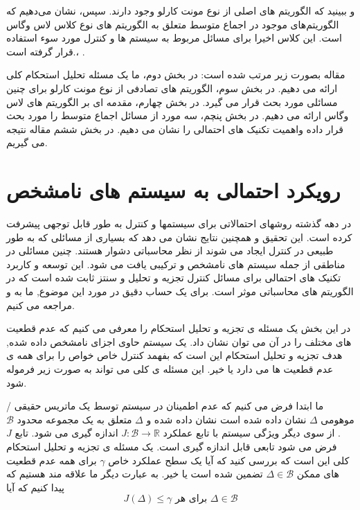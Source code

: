 \documentclass[12pt]{article} %
\begin{document}
	و ببینید که الگوریتم های اصلی از نوع مونت کارلو وجود دارند.
	سپس، نشان می‌دهیم که الگوریتم‌های موجود در
	اجماع متوسط ​​متعلق به الگوریتم های نوع کلاس لاس وگاس است.
	این کلاس اخیرا برای مسائل مربوط به سیستم ها و کنترل  مورد سوء استفاده قرار گرفته است.\cite{bib11}، \cite{bib24}.
	\par
	مقاله بصورت زیر مرتب شده است:
	در بخش دوم، ما
	یک مسئله تحلیل استحکام کلی ارائه می دهیم.
	در بخش سوم، الگوریتم های تصادفی از نوع مونت کارلو برای
	چنین مسائلی مورد بحث قرار می گیرد.
	در بخش چهارم، مقدمه ای بر الگوریتم های لاس وگاس ارائه می دهیم.
	در بخش پنچم،
	سه مورد از مسائل اجماع متوسط ​​را مورد بحث قرار داده واهمیت تکنیک های احتمالی را نشان می دهیم.
	در بخش ششم مقاله نتیجه می گیریم.
	
	\section{رویکرد احتمالی به سیستم های نامشخص}
	در دهه گذشته روشهای احتمالاتی برای سیستمها
	و کنترل به طور قابل توجهی پیشرفت کرده است.
	این تحقیق و 
	همچنین نتایج نشان می دهد که بسیاری از 
	مسائلی که به طور طبیعی در کنترل ایجاد می شوند از نظر محاسباتی دشوار هستند.
	چنین مسائلی
	در مناطقی از جمله سیستم های نامشخص و ترکیبی یافت می شود.
	این
	توسعه و کاربرد تکنیک های احتمالی برای
	مسائل کنترل تجزیه و تحلیل و سنتز ثابت شده است که در الگوریتم های  محاسباتی موثر است.
	برای
	یک حساب دقیق در مورد این موضوع, ما به  \cite{bib23} و\cite{bib26} مراجعه می کنیم.
	\par
	در این بخش یک مسئله ی تجزیه و تحلیل استحکام را معرفی می کنیم که عدم قطعیت های مختلف را در آن می توان نشان داد.
	یک سیستم حاوی اجزای نامشخص داده شده, هدف
	تجزیه و تحلیل استحکام این است که بفهمد کنترل خاص
	خواص  را برای همه ی عدم قطعیت ها می دارد یا خیر.
	این مسئله ی کلی
	می تواند به صورت زیر فرموله شود.
	\par
	ما ابتدا فرض می کنیم که عدم اطمینان در سیستم  توسط یک ماتریس حقیقی / موهومی 
	$\Delta$ 
	نشان داده شده است
	نشان داده شده  و $\Delta$ 
	متعلق به یک مجموعه محدود
	$\mathscr{B}$.
	از سوی دیگر
	ویژگی سیستم با تابع عملکرد 
	$J : \mathscr{B} \rightarrow \mathbb{R}$
	اندازه گیری می شود.
	تابع $J$
	فرض می شود تابعی قابل اندازه گیری است.
	یک مسئله ی تجزیه و تحلیل استحکام کلی این است که بررسی کنید
	که آیا یک سطح عملکرد خاص $\gamma$
	برای همه عدم قطعیت های ممکن
	$\Delta \in \mathscr{B}$
	تضمین شده است یا خیر.
	به عبارت دیگر ما علاقه مند هستیم که پیدا کنیم که آیا
	\begin{equation}
		\label{eqn:(1)}
		J(\Delta ) \leqslant \gamma \textrm{ برای هر } \Delta \in \mathscr{B}
	\end{equation}
\end{document}
